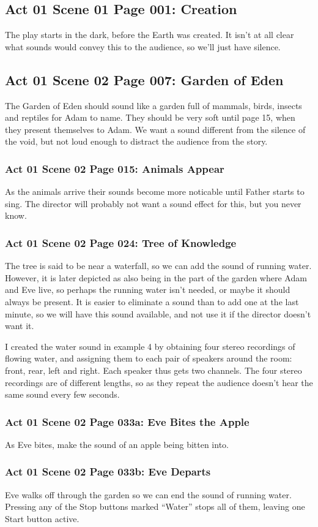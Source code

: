 \documentclass[letterpaper,twoside]{article}
\begin{document}
\subsection{Act 01 Scene 01 Page 001: Creation}
The play starts in the dark, before the Earth was created.
It isn't at all clear what sounds would convey this to the
audience, so we'll just have silence.
\subsection{Act 01 Scene 02 Page 007: Garden of Eden}
The Garden of Eden should sound like a garden full of mammals,
birds, insects and reptiles for Adam to name.  They should be
very soft until page 15, when they present themselves to Adam.
We want a sound different from the silence
of the void, but not loud enough to distract the audience
from the story.
\subsubsection{Act 01 Scene 02 Page 015: Animals Appear}
As the animals arrive their sounds become more noticable until
Father starts to sing.  The director will probably not want a
sound effect for this, but you never know.
\subsubsection{Act 01 Scene 02 Page 024: Tree of Knowledge}
The tree is said to be near a waterfall, so we can add the sound
of running water.  However, it is later depicted as also being in the
part of the garden where Adam and Eve live, so perhaps the
running water isn't needed, or maybe it should always be present.
It is easier to eliminate a sound
than to add one at the last minute, so we will have this sound
available, and not use it if the director doesn't want it.

I created the water sound in example 4 by obtaining four
stereo recordings of flowing water, and assigning them to
each pair of speakers around the room: front, rear, left and right.
Each speaker thus gets two channels.  The four stereo recordings
are of different lengths, so as they repeat the audience doesn't
hear the same sound every few seconds.
\subsubsection{Act 01 Scene 02 Page 033a: Eve Bites the Apple}
As Eve bites, make the sound of an apple being bitten into.
\subsubsection{Act 01 Scene 02 Page 033b: Eve Departs}
Eve walks off through the garden so
we can end the sound of running water.  Pressing any of the Stop
buttons marked ``Water'' stops all of them, leaving one Start button
active.
\end{document}
